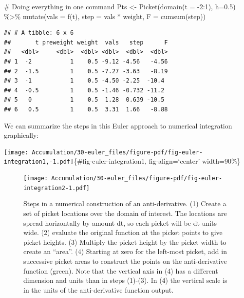 \documentclass[
  letterpaper,
  DIV=11,
  numbers=noendperiod,
  oneside]{scrreprt}
\newenvironment{Shaded}{\begin{snugshade}}{\end{snugshade}}
\newcommand{\AttributeTok}[1]{\textcolor[rgb]{0.40,0.46,0.14}{#1}}
\newcommand{\CommentTok}[1]{\textcolor[rgb]{0.37,0.37,0.37}{#1}}
\newcommand{\DecValTok}[1]{\textcolor[rgb]{0.68,0.00,0.00}{#1}}
\newcommand{\FloatTok}[1]{\textcolor[rgb]{0.68,0.00,0.00}{#1}}
\newcommand{\FunctionTok}[1]{\textcolor[rgb]{0.28,0.35,0.67}{#1}}
\newcommand{\NormalTok}[1]{\textcolor[rgb]{0.00,0.46,0.62}{#1}}
\newcommand{\OtherTok}[1]{\textcolor[rgb]{0.00,0.46,0.62}{#1}}
\newcommand{\SpecialCharTok}[1]{\textcolor[rgb]{0.37,0.37,0.37}{#1}}
\begin{document}
\begin{Shaded}
\begin{Highlighting}[]
\CommentTok{\# Doing everything in one command}
\NormalTok{Pts }\OtherTok{\textless{}{-}} 
  \FunctionTok{Picket}\NormalTok{(}\FunctionTok{domain}\NormalTok{(}\AttributeTok{t =} \SpecialCharTok{{-}}\DecValTok{2}\SpecialCharTok{:}\DecValTok{1}\NormalTok{), }\AttributeTok{h=}\FloatTok{0.5}\NormalTok{) }\SpecialCharTok{\%\textgreater{}\%}
  \FunctionTok{mutate}\NormalTok{(}\AttributeTok{vals =} \FunctionTok{f}\NormalTok{(t),}
         \AttributeTok{step =}\NormalTok{ vals }\SpecialCharTok{*}\NormalTok{ weight,}
         \AttributeTok{F =} \FunctionTok{cumsum}\NormalTok{(step))}
\end{Highlighting}
\end{Shaded}

\begin{verbatim}
## # A tibble: 6 x 6
##       t preweight weight  vals   step      F
##   <dbl>     <dbl>  <dbl> <dbl>  <dbl>  <dbl>
## 1  -2           1    0.5 -9.12 -4.56   -4.56
## 2  -1.5         1    0.5 -7.27 -3.63   -8.19
## 3  -1           1    0.5 -4.50 -2.25  -10.4 
## 4  -0.5         1    0.5 -1.46 -0.732 -11.2 
## 5   0           1    0.5  1.28  0.639 -10.5 
## 6   0.5         1    0.5  3.31  1.66   -8.88
\end{verbatim}

We can summarize the steps in this Euler approach to numerical
integration graphically:

\texttt{[image: Accumulation/30-euler\_files/figure-pdf/fig-euler-integration1,-1.pdf]}\{\#fig-euler-integration1,
fig-align=`center' width=90\%\}

\begin{figure}

{\centering \texttt{[image: Accumulation/30-euler\_files/figure-pdf/fig-euler-integration2-1.pdf]}

}

\caption{\label{fig-euler-integration2}Steps in a numerical construction
of an anti-derivative. (1) Create a set of picket locations over the
domain of interest. The locations are spread horizontally by amount dt,
so each picket will be dt units wide. (2) evaluate the original function
at the picket points to give picket heights. (3) Multiply the picket
height by the picket width to create an ``area''. (4) Starting at zero
for the left-most picket, add in successive picket areas to construct
the points on the anti-derivative function (green). Note that the
vertical axis in (4) has a different dimension and units than in steps
(1)-(3). In (4) the vertical scale is in the units of the
anti-derivative function output.}

\end{figure}
\end{document}
